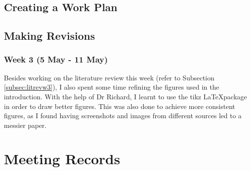 \documentclass[a4paper, 12pt]{extreport}
\begin{document}
		\section{Creating a Work Plan}
		
		\section{Making Revisions}
		
			\subsection{Week 3 (5 May - 11 May)}\label{subsec:revw3}
				
				Besides working on the literature review this week (refer to Subsection \ref{subsec:litrevw3}), I also spent some time refining the figures used in the introduction. With the help of Dr Richard, I learnt to use the tikz \LaTeX package in order to draw better figures. This was also done to achieve more consistent figures, as I found having screenshots and images from different sources led to a messier paper.
		
	\nocite{*}
	\printbibliography[heading={bibnumbered}, title={Bibliography}]
	
	\chapter{Meeting Records}
		
		
		
		
		
		
		
		
		
\end{document}
